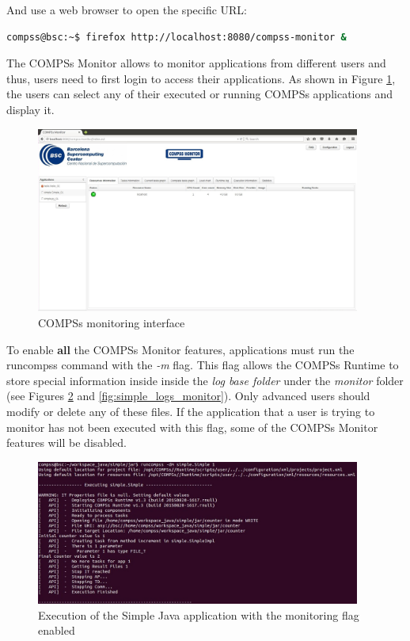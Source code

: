 And use a web browser to open the specific URL:
\begin{lstlisting}[language=bash]
compss@bsc:~$ firefox http://localhost:8080/compss-monitor &
\end{lstlisting}

The COMPSs Monitor allows to monitor applications from different users and thus, users need to first login to access their applications. As shown in Figure \ref{fig:monitoring_interface}, the users can select any of their executed or running COMPSs applications and display it.
\begin{figure}[thb!]
  \centering
    \includegraphics[width=0.95\textwidth]{./Sections/4_Tools/Figures/compss_monitor.jpeg}
    \caption{COMPSs monitoring interface}
    \label{fig:monitoring_interface}
\end{figure}

To enable \textbf{all} the COMPSs Monitor features, applications must run the runcompss command with the \textit{-m} flag. This flag 
allows the  COMPSs Runtime to store special information inside inside the \textit{log base folder} under the \textit{monitor} 
folder (see Figures \ref{fig:simple_exec_monitor} and \ref{fig:simple_logs_monitor}). Only advanced users should modify or delete any of these files. If the application that a user is trying to monitor 
has not been executed with this flag, some of the COMPSs Monitor features will be disabled. 
\begin{figure}[ht!]
  \centering
    \includegraphics[width=0.95\textwidth]{./Sections/4_Tools/Figures/simple_monitor.jpeg}
    \caption{Execution of the Simple Java application with the monitoring flag enabled}
    \label{fig:simple_exec_monitor}
\end{figure}

